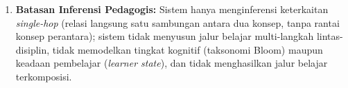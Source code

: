 \documentclass[main]{subfiles}
\begin{document}
\begin{enumerate}
  \item \textbf{Batasan Inferensi Pedagogis:} Sistem hanya menginferensi
        keterkaitan \textit{single-hop} (relasi langsung satu sambungan
        antara dua konsep, tanpa rantai konsep perantara); sistem tidak
        menyusun jalur belajar multi-langkah lintas-disiplin, tidak
        memodelkan tingkat kognitif (taksonomi Bloom) maupun keadaan
        pembelajar (\textit{learner state}), dan tidak menghasilkan jalur
        belajar terkomposisi.
\end{enumerate}

\ifSubfilesClassLoaded{\printbibliography[title={Daftar Pustaka}]}{}
\end{document}
